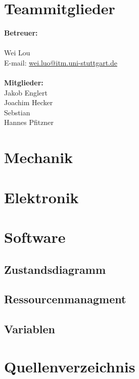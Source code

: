 \documentclass{article}
\begin{document}
\tableofcontents
\newpage
\section{Teammitglieder}
\textbf {Betreuer:}\\
\\
 Wei Lou\\
\hfill  E-mail: \href{wei.luo@itm.uni-stuttgart.de}{wei.luo@itm.uni-stuttgart.de}\\
\\
\textbf {Mitglieder:}\\
Jakob Englert\\
Joachim Hecker\\
Sebstian\\
Hannes Pfitzner\\

\newpage
\section{Mechanik}
\newpage
\section{Elektronik}
\newpage
\section{Software}
\subsection{Zustandsdiagramm}
\subsection{Ressourcenmanagment}
\subsection{Variablen}
\section{Quellenverzeichnis}
\end{document}

